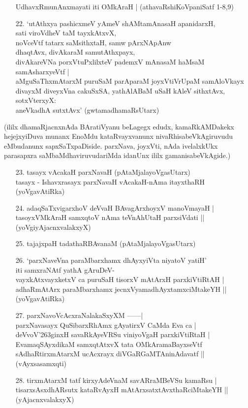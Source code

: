 \begin{itemize}
UdhavxRmunAnxmayati iti OMkAraH |
\hfill{(athavaRshiKoVpaniSatf 1-8,9)} 
\item[22.] `utAthxya pashicxmeV yAmeV shAMtamAnasaH apanidarxH,\\
sati viroVdheV taM tayxkAtxvX,\\
noVceVtf tatarx saMsithxtaH, samw pArxNApAnw\\
dhaqtAvx, divAkaraM samutAthxpayx,\\
divAkareVNa porxVtuPxlilxteV pademxV mAnasaM haMsaM samAsharxyeVtf |\\
aMguSaThxmAtarxM puruSaM parAparaM joyxVtiVrUpaM samAloVkayx\\
divayxM diveyxVna cakuSxSA, yathAlABaM uSaH kAleV sithxtAvx, sotxVterxyX:\\
aneVkadhA sutxtAvx'
\hfill{(gwtamadhamaRsUtarx)}
\end{itemize}

(ililx dhamaRjacnxnAda BAratiVyanu beLagegx edudx, kamaRkAMDakekx hejejxyiDuva munanx EnoMdu kataRvayxvanunx nivaRhisabeVkAgiruvudu eMbudanunx sapxSaTxpaDiside. parxNava, joyxVti, nAda ivelalxkUkx parasapxra saMbaMdhaviruvudariMda idanUnx ililx gamanisabeVkAgide.)

\begin{itemize}
\item[23.] tasayx vAcakaH parxNavaH (pAtaMjalayoVgasUtarx)\\
tasayx - Ishavxrasayx parxNavaH vAcakaH-nAma itayxthaRH 
\hfill{(yoVgavAtiRka)}
\item[24.] adaqSaTxvigarxhoV deVvaH BAvagArxhoyxV manoVmayaH |\\
tasoyxVMkAraH samxqtoV nAma teVnAhUtaH parxsiVdati ||\\
\hfill{(yoVgiyAjacnxvalakxyX)}
\item[25.] tajajxpaH tadathaRBAvanaM \hfill{(pAtaMjalayoVgasUtarx)}
\item[26.] `parxNaveVna paraMbarxhamx dhAyxyiVta niyatoV yatiH'\\
iti samxraNAtf yathA gAruDeV-\\
vayxkAtxvayxketxV ca puruSaH tisorxV mAtArxH parxkiVtiRtAH |\\
adhaRmAtArx paraMbarxhamx jecnxVyamadhAyxtamxciMtakeYH ||
\hfill{(yoVgavAtiRka)}
\item[27.] parxNavoVcAcxraNalakaSxyXM ------|\\
parxNavasayx QuSibarxRhAmx gAyatirxV CaMda Eva ca |\\
deVvoV\char'263ginxH savaRkAyeVRSu viniyoVgaH parxkiVtiRtaH |\\
EvamaqSAyxdikaM samxqtAtxvX tata OMkAramaBayxseVtf\\
sAdhaRtirxmAtarxM ucAcxrayx diVGaRGaMTAninAdavatf ||
\hfill{(vAyxsasamxqti)}
\item[28.] tirxmAtarxM tatf kirxyAdeVnaM savARraMBeVSu kamaRsu |\\
tisarxsAsxdhARsutx kataRvAyxH mAtArxsatxtAvxthaRciMtakeYH ||
\hfill{(yAjacnxvalakxyX)}\\
\end{itemize}

